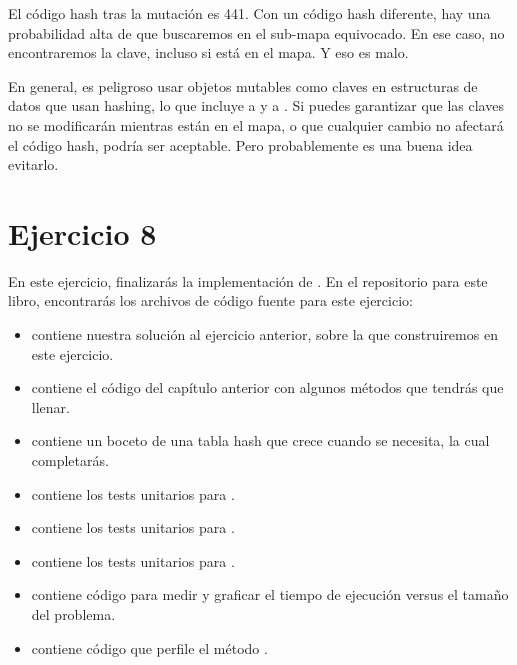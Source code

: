 \documentclass[12pt]{book}
\theoremstyle{exercise}
\begin{document}
El código hash tras la mutación es 441. Con un código hash diferente,
hay una probabilidad alta de que buscaremos en el sub-mapa equivocado. En
ese caso, no encontraremos la clave, incluso si está en el mapa. Y eso
es malo.


En general, es peligroso usar objetos mutables como claves en
estructuras de datos que usan hashing, lo que incluye a  
y a . Si puedes garantizar que las claves no se modificarán
mientras están en el mapa, o que cualquier cambio no afectará el código
hash, podría ser aceptable. Pero probablemente es una buena idea evitarlo.


\section{Ejercicio 8}


En este ejercicio, finalizarás la implementación de
.  En el repositorio para este libro,
encontrarás los archivos de código fuente para este ejercicio:

\begin{itemize}

\item
   contiene nuestra solución al ejercicio anterior,
  sobre la que construiremos en este ejercicio.
\item
   contiene el código del capítulo anterior con
  algunos métodos que tendrás que llenar.

\item
   contiene un boceto de una tabla hash que
  crece cuando se necesita, la cual completarás.

\item
   contiene los tests unitarios para
  .

\item
   contiene los tests unitarios para
  .

\item
   contiene los tests unitarios para
  .

\item
   contiene código para medir y graficar el
  tiempo de ejecución versus el tamaño del problema.

\item
   contiene código que perfile el método
  .
\end{itemize}
\end{document}
